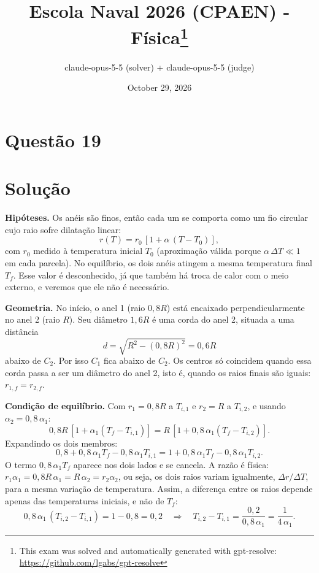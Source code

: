 \documentclass{article}%
\title{Escola Naval 2026 (CPAEN) - Física\thanks{This exam was solved and automatically generated with gpt-resolve: \url{https://github.com/lgabs/gpt-resolve}}}%
\author{claude{-}opus{-}5{-}5 (solver) + claude{-}opus{-}5{-}5 (judge)}%
\date{October 29, 2026}%
\begin{document}
%
\normalsize%
\maketitle%
\section*{Questão 19}

\section*{Solução}

\textbf{Hipóteses.} Os anéis são finos, então cada um se comporta como um fio circular cujo raio sofre dilatação linear:
\[
r(T)=r_0\,[1+\alpha\,(T-T_0)],
\]
com $r_0$ medido à temperatura inicial $T_0$ (aproximação válida porque $\alpha\,\Delta T\ll 1$ em cada parcela). No equilíbrio, os dois anéis atingem a mesma temperatura final $T_f$. Esse valor é desconhecido, já que também há troca de calor com o meio externo, e veremos que ele não é necessário.

\textbf{Geometria.} No início, o anel 1 (raio $0{,}8R$) está encaixado perpendicularmente no anel 2 (raio $R$). Seu diâmetro $1{,}6R$ é uma corda do anel 2, situada a uma distância
\[
d=\sqrt{R^2-(0{,}8R)^2}=0{,}6R
\]
abaixo de $C_2$. Por isso $C_1$ fica abaixo de $C_2$. Os centros só coincidem quando essa corda passa a ser um diâmetro do anel 2, isto é, quando os raios finais são iguais: $r_{1,f}=r_{2,f}$.

\textbf{Condição de equilíbrio.} Com $r_{1}=0{,}8R$ a $T_{i,1}$ e $r_{2}=R$ a $T_{i,2}$, e usando $\alpha_2=0{,}8\,\alpha_1$:
\[
0{,}8R\,[1+\alpha_1(T_f-T_{i,1})]=R\,[1+0{,}8\,\alpha_1(T_f-T_{i,2})].
\]
Expandindo os dois membros:
\[
0{,}8+0{,}8\,\alpha_1T_f-0{,}8\,\alpha_1T_{i,1}=1+0{,}8\,\alpha_1T_f-0{,}8\,\alpha_1T_{i,2}.
\]
O termo $0{,}8\,\alpha_1T_f$ aparece nos dois lados e se cancela. A razão é física: $r_{1}\alpha_1=0{,}8R\,\alpha_1=R\,\alpha_2=r_{2}\alpha_2$, ou seja, os dois raios variam igualmente, $\Delta r/\Delta T$, para a mesma variação de temperatura. Assim, a diferença entre os raios depende apenas das temperaturas iniciais, e não de $T_f$:
\[
0{,}8\,\alpha_1\,(T_{i,2}-T_{i,1})=1-0{,}8=0{,}2
\quad\Longrightarrow\quad
T_{i,2}-T_{i,1}=\frac{0{,}2}{0{,}8\,\alpha_1}=\frac{1}{4\,\alpha_1}.
\]
\end{document}
